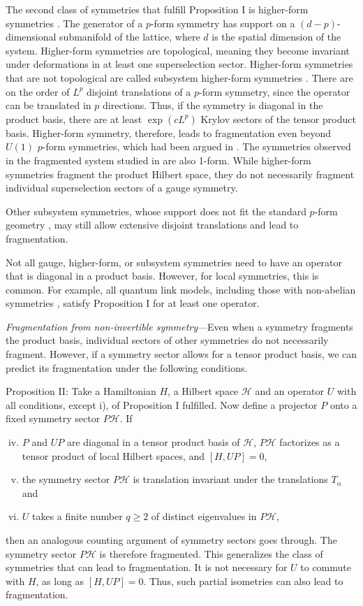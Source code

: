 \documentclass[
 reprint,
 amsmath,amssymb,
 aps,floatfix,prl,superscriptaddress
]{revtex4-2}
\newcounter{paranum}
\renewcommand{\theparanum}{\Roman{paranum}} %
\newcommand{\pnum}[1]{%
  \textit{#1}---}
\begin{document}
The second class of symmetries that fulfill Proposition I is higher-form symmetries \cite{Gaiotto:2014kfa,Cao:2023doz}. The generator of a $p$-form symmetry has support on a $(d-p)$-dimensional submanifold of the lattice, where $d$ is the spatial dimension of the system. Higher-form symmetries are topological, meaning they become invariant under deformations in at least one superselection sector. Higher-form symmetries that are not topological are called subsystem higher-form symmetries \cite{Cao:2023doz}. There are on the order of $L^p$ disjoint translations of a $p$-form symmetry, since the operator can be translated in $p$ directions. Thus, if the symmetry is diagonal in the product basis, there are at least $\exp(c L^p)$ Krylov sectors of the tensor product basis. 
Higher-form symmetry, therefore, leads to fragmentation even beyond $U(1)$ $p$-form symmetries, which had been argued in \cite{sohal2025}. The symmetries observed in the fragmented system studied in \cite{Khudorozhkov:2021oig} are also 1-form. While higher-form symmetries fragment the product Hilbert space, they do not necessarily fragment individual superselection sectors of a gauge symmetry.


Other subsystem symmetries, whose support does not fit the standard $p$-form geometry \cite{Devakul_2019}, may still allow extensive disjoint translations and lead to fragmentation.

Not all gauge, higher-form, or subsystem symmetries need to have an operator that is diagonal in a product basis. However, for local symmetries, this is common.  For example, all quantum link models, including those with non-abelian symmetries \cite{Wiese:2021djl}, satisfy Proposition I for at least one operator.

\pnum{Fragmentation from non-invertible symmetry}Even when a symmetry fragments the product basis, individual sectors of other symmetries do not necessarily fragment. However, if a symmetry sector allows for a tensor product basis, we can predict its fragmentation under the following conditions.

Proposition II: Take a Hamiltonian $H$, a Hilbert space $\mathcal{H}$ and an operator $U$ with all conditions, except i), of Proposition I fulfilled.
Now define a projector $P$ onto a fixed symmetry sector $P\mathcal{H}$. If
\begin{enumerate}[i)]
    \setcounter{enumi}{3}
    \item $P$ and $UP$ are diagonal in a tensor product basis of $\mathcal{H}$, $P\mathcal{H}$ factorizes as a tensor product of local Hilbert spaces, and $[H, UP]=0$,
    \item the symmetry sector $P\mathcal{H}$ is translation invariant under the translations $T_\alpha$ and
    \item $U$ takes a finite number $q\geq 2$ of distinct eigenvalues in $P\mathcal{H}$,
\end{enumerate}
then an analogous counting argument of symmetry sectors goes through. The symmetry sector $P\mathcal{H}$ is therefore fragmented.
This generalizes the class of symmetries that can lead to fragmentation. It is not necessary for $U$ to commute with $H$, as long as $[H,UP]=0$. Thus, such partial isometries can also lead to fragmentation. 
\end{document}
